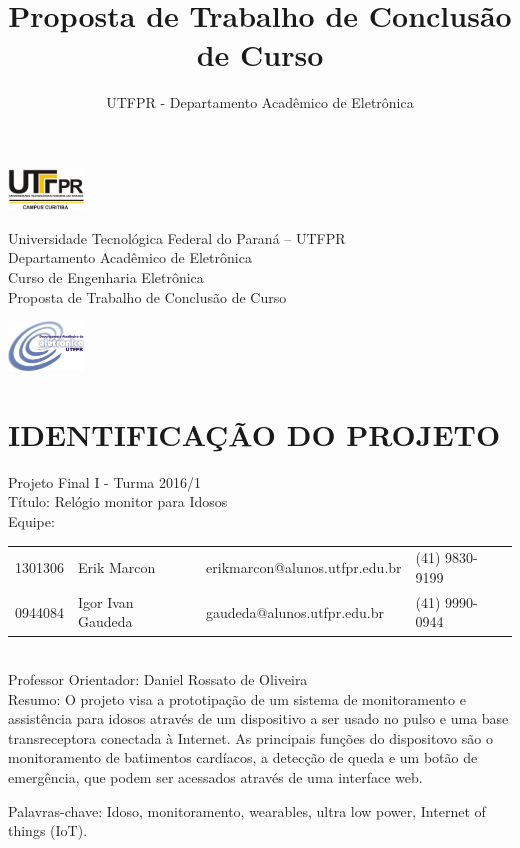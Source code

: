 \documentclass[a4paper]{article}
\title{Proposta de Trabalho de Conclusão de Curso}
\author{UTFPR - Departamento Acadêmico de Eletrônica}
\date{\the\year}
\begin{document}
\noindent
\includegraphics[width=0.15\textwidth]{figuras/UTFPR.png}
\begin{minipage}[b]{0.7\textwidth}
\centering
\Large{
Universidade Tecnológica Federal do Paraná – UTFPR\\
Departamento Acadêmico de Eletrônica\\
Curso de Engenharia Eletrônica \\
Proposta de Trabalho de Conclusão de Curso}
\end{minipage}
\includegraphics[width=0.15\textwidth]{figuras/daeln.jpg}

\section{IDENTIFICAÇÃO DO PROJETO}

Projeto Final I - Turma 2016/1 \\

Título: Relógio monitor para Idosos \\

Equipe:
\newline
	
\begin{tabular}{llll}
	1301306 & Erik Marcon & erikmarcon@alunos.utfpr.edu.br & (41) 9830-9199 \\
	0944084 & Igor Ivan Gaudeda & gaudeda@alunos.utfpr.edu.br & (41) 9990-0944
\end{tabular} \\

Professor Orientador: Daniel Rossato de Oliveira \\

Resumo: O projeto visa a prototipação de um sistema de monitoramento e assistência para idosos através de um dispositivo a ser usado no pulso e uma base transreceptora conectada à Internet. As principais funções do dispositovo são o monitoramento de batimentos cardíacos, a detecção de queda e um botão de emergência, que podem ser acessados através de uma interface web.

Palavras-chave: Idoso, monitoramento, wearables, ultra low power, Internet of things (IoT).
\end{document}
